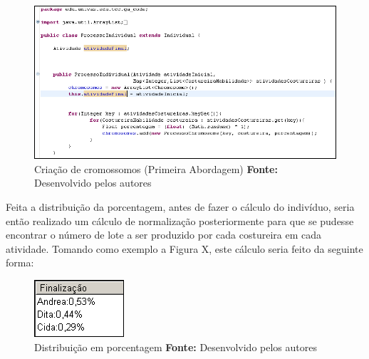 \begin{figure}[h!]
	\centerline{\includegraphics[scale=0.8]{./imagens/tentativa_1_individual.png}}
	\caption[Classe CostureiraHabilidade]
	{Criação de cromossomos (Primeira Abordagem) \textbf{Fonte:} Desenvolvido pelos autores}
	\label{fig:exemplo1}
\end{figure}
 
\par Feita a distribuição da porcentagem, antes de fazer o cálculo do indivíduo, seria então realizado 
um cálculo de normalização posteriormente para que se pudesse encontrar o número de lote a ser produzido 
por cada costureira em cada atividade. Tomando como exemplo a Figura X, este cálculo seria feito da seguinte forma:

\begin{figure}[h!]
	\centerline{\includegraphics[scale=1.0]{./imagens/distribuicao_porcentagem.png}}
	\caption[Classe CostureiraHabilidade]
	{Distribuição em porcentagem \textbf{Fonte:} Desenvolvido pelos autores}
	\label{fig:exemplo1}
\end{figure}

